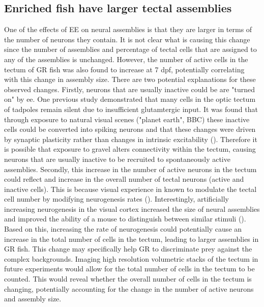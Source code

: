 \subsection{Enriched fish have larger tectal assemblies}
One of the effects of EE on neural assemblies is that they are larger in terms of the number of neurons they contain.  It is not clear what is causing this change since the number of assemblies and percentage of tectal cells that are assigned to any of the assemblies is unchanged. However, the number of active cells in the tectum of GR fish was also found to increase at 7 dpf, potentially correlating with this change in assembly size. There are two potential explanations for these observed changes. Firstly, neurons that are usually inactive could be are "turned on" by \gls{ee}. One previous study demonstrated that many cells in the optic tectum of tadpoles remain silent due to insufficient glutamtergic input. It was found that through exposure to natural visual scenes ("planet earth", BBC) these inactive cells could be converted into spiking neurons and that these changes were driven by synaptic plasticity rather than changes in intrinsic excitability (\cite{vanRheede2015Sensory-EvokedMechanism}). Therefore it is possible that exposure to gravel alters connectivity within the tectum, causing neurons that are usually inactive to be recruited to spontaneously active assemblies. Secondly, this increase in the number of active neurons in the tectum could reflect and increase in the overall number of tectal neurons (active and inactive cells). This is because visual experience in known to modulate the tectal cell number by modifying neurogenesis rates (\cite{Hall2018VisualTectum}). Interestingly, artificially increasing neurogenesis in the visual cortex increased the size of neural assemblies and improved the ability of a mouse to distinguish between similar stimuli (\cite{Fang2017OverproductionDiscrimination}). Based on this, increasing the rate of neurogenesis could potentially cause an increase in the total number of cells in the tectum, leading to larger assemblies in GR fish. This change may specifically help GR to discriminate prey against the complex backgrounds. Imaging high resolution volumetric stacks of the tectum in future experiments would allow for the total number of cells in the tectum to be counted. This would reveal whether the overall number of cells in the tectum is changing, potentially accounting for the change in the number of active neurons and assembly size. 


